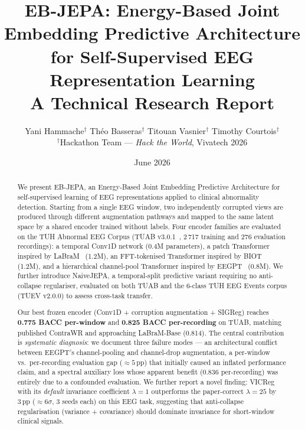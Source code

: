 \documentclass[11pt,a4paper]{article}
\title{\LARGE\bfseries EB-JEPA: Energy-Based Joint Embedding Predictive Architecture\\
for Self-Supervised EEG Representation Learning\\[4pt]
{\large A Technical Research Report}}
\author{
  Yani Hammache$^{\dagger}$ \quad
  Th\'eo Basseras$^{\dagger}$ \quad
  Titouan Vasnier$^{\dagger}$ \quad
  Timothy Courtois$^{\dagger}$\\[4pt]
  \small$^{\dagger}$Hackathon Team --- \textit{Hack the World}, Vivatech 2026
}
\date{June 2026}
\begin{document}
\maketitle

\begin{abstract}
We present EB-JEPA, an Energy-Based Joint Embedding Predictive Architecture
for self-supervised learning of EEG representations applied to clinical abnormality
detection.  Starting from a single EEG window, two independently corrupted views
are produced through different augmentation pathways and mapped to the same latent
space by a shared encoder trained without labels.  Four encoder families are evaluated
on the TUH Abnormal EEG Corpus (TUAB v3.0.1~\cite{tuab}, 2\,717 training and 276 evaluation
recordings): a temporal Conv1D network (0.4M parameters), a patch Transformer inspired
by LaBraM~\cite{labram} (1.2M), an FFT-tokenised Transformer inspired by BIOT~\cite{biot}
(1.2M), and a hierarchical channel-pool Transformer inspired by EEGPT~\cite{eegpt} (0.8M).
We further introduce NaiveJEPA, a temporal-split predictive variant requiring no
anti-collapse regulariser, evaluated on both TUAB and the 6-class TUH EEG Events corpus
(TUEV v2.0.0) to assess cross-task transfer.

Our best frozen encoder (Conv1D + corruption augmentation + SIGReg) reaches
\textbf{0.775 BACC per-window} and \textbf{0.825 BACC per-recording} on TUAB,
matching published ContraWR and approaching LaBraM-Base (0.814).
The central contribution is \emph{systematic diagnosis}: we document three failure
modes --- an architectural conflict between EEGPT's channel-pooling and channel-drop
augmentation, a per-window vs.\ per-recording evaluation gap (${\approx}5$\,pp) that
initially caused an inflated performance claim, and a spectral auxiliary loss whose
apparent benefit (0.836 per-recording) was entirely due to a confounded evaluation.
We further report a novel finding: VICReg with its \emph{default} invariance coefficient
$\lambda{=}1$ outperforms the paper-correct $\lambda{=}25$ by $3\,\text{pp}$ (${\approx}6\sigma$,
3 seeds each) on this EEG task, suggesting that anti-collapse regularisation (variance +
covariance) should dominate invariance for short-window clinical signals.
\end{abstract}

\tableofcontents
\newpage

\end{document}
